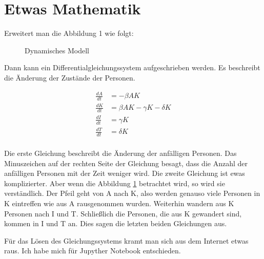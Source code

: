 \documentclass[11pt, a4paper]{article}
\begin{document}
\newpage
\section{Etwas Mathematik}
Erweitert man die Abbildung 1 wie folgt:
\begin{figure}[h]
\centering
{}
\label{dynModel}
\caption{Dynamisches Modell}
\end{figure}

Dann kann ein Differentialgleichungssystem aufgeschrieben werden. Es beschreibt die
Änderung der Zustände der Personen.

\begin{equation}
    \begin{aligned}
        \frac{dA}{dt} &= -\beta AK                      \\[5pt]
        \frac{dK}{dt} &= \beta AK - \gamma K - \delta K \\[5pt]
        \frac{dI}{dt} &= \gamma K                       \\[5pt]
        \frac{dT}{dt} &= \delta K                       \\
    \end{aligned}
\end{equation}

Die erste Gleichung beschreibt die Änderung der anfälligen Personen. Das Minuszeichen auf
der rechten Seite der Gleichung besagt, dass die Anzahl der anfälligen Personen mit der
Zeit weniger wird. Die zweite Gleichung ist ewas komplizierter. Aber wenn  die Abbildung
\ref{dynModel} betrachtet wird, so wird sie verständlich. Der Pfeil geht von A nach K, also
werden genauso viele Personen in K eintreffen wie aus A rausgenommen wurden. Weiterhin
wandern aus K Personen nach I und T. Schließlich die Personen, die aus K gewandert sind,
kommen in I und T an. Dies sagen die letzten beiden Gleichungen aus.

Für das Lösen des Gleichungssystems kramt man sich aus dem Internet etwas raus. Ich habe
mich für  Jupyther Notebook entschieden.
\end{document}
